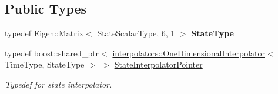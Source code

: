 \subsection*{Public Types}
\begin{DoxyCompactItemize}
\item 
typedef Eigen\+::\+Matrix$<$ State\+Scalar\+Type, 6, 1 $>$ {\bfseries State\+Type}\hypertarget{classtudat_1_1ephemerides_1_1TabulatedCartesianEphemeris_aa73683bad12ac496b55367c6071098ad}{}\label{classtudat_1_1ephemerides_1_1TabulatedCartesianEphemeris_aa73683bad12ac496b55367c6071098ad}

\item 
typedef boost\+::shared\+\_\+ptr$<$ \hyperlink{classtudat_1_1interpolators_1_1OneDimensionalInterpolator}{interpolators\+::\+One\+Dimensional\+Interpolator}$<$ Time\+Type, State\+Type $>$ $>$ \hyperlink{classtudat_1_1ephemerides_1_1TabulatedCartesianEphemeris_ac99b60b8a32901ffa73148e7d6eb557a}{State\+Interpolator\+Pointer}\hypertarget{classtudat_1_1ephemerides_1_1TabulatedCartesianEphemeris_ac99b60b8a32901ffa73148e7d6eb557a}{}\label{classtudat_1_1ephemerides_1_1TabulatedCartesianEphemeris_ac99b60b8a32901ffa73148e7d6eb557a}

\begin{DoxyCompactList}\small\item\em Typedef for state interpolator. \end{DoxyCompactList}\end{DoxyCompactItemize}
